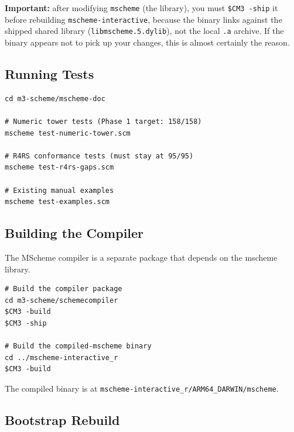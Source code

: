 \documentclass[12pt]{article}
\begin{document}
\noindent \textbf{Important:} after modifying {\tt mscheme} (the
library), you must {\tt \$CM3 -ship} it before rebuilding
{\tt mscheme-interactive}, because the binary links against the
shipped shared library ({\tt libmscheme.5.dylib}), not the local
{\tt .a} archive.  If the binary appears not to pick up your
changes, this is almost certainly the reason.

\subsection{Running Tests}

\begin{lstlisting}[language={}]
cd m3-scheme/mscheme-doc

# Numeric tower tests (Phase 1 target: 158/158)
mscheme test-numeric-tower.scm

# R4RS conformance tests (must stay at 95/95)
mscheme test-r4rs-gaps.scm

# Existing manual examples
mscheme test-examples.scm
\end{lstlisting}

\subsection{Building the Compiler}

The MScheme compiler is a separate package that depends on the
mscheme library.

\begin{lstlisting}[language={}]
# Build the compiler package
cd m3-scheme/schemecompiler
$CM3 -build
$CM3 -ship

# Build the compiled-mscheme binary
cd ../mscheme-interactive_r
$CM3 -build
\end{lstlisting}

\noindent The compiled binary is at
{\tt mscheme-interactive\_r/ARM64\_DARWIN/mscheme}.

\subsection{Bootstrap Rebuild}
\end{document}
